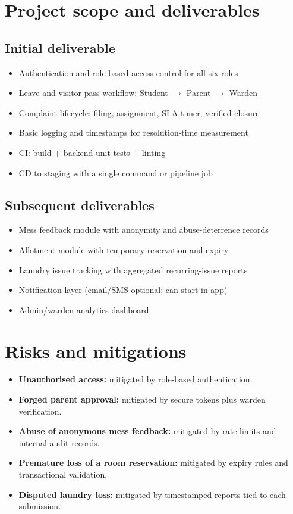 \documentclass[11pt,a4paper]{article}
\begin{document}
\section{Project scope and deliverables }
\subsection{Initial deliverable }
\begin{itemize}[leftmargin=0.7cm]
    \item Authentication and role-based access control for all six roles
    \item Leave and visitor pass workflow: Student $\rightarrow$ Parent $\rightarrow$ Warden
    \item Complaint lifecycle: filing, assignment, SLA timer, verified closure
    \item Basic logging and timestamps for resolution-time measurement
    \item CI: build + backend unit tests + linting
    \item CD to staging with a single command or pipeline job
\end{itemize}

\subsection{Subsequent deliverables}
\begin{itemize}[leftmargin=0.7cm]
    \item Mess feedback module with anonymity and abuse-deterrence records
    \item Allotment module with temporary reservation and expiry
    \item Laundry issue tracking with aggregated recurring-issue reports
    \item Notification layer (email/SMS optional; can start in-app)
    \item Admin/warden analytics dashboard
\end{itemize}

\section{Risks and mitigations}
\begin{itemize}[leftmargin=0.7cm]
    \item \textbf{Unauthorised access:} mitigated by role-based authentication.
    \item \textbf{Forged parent approval:} mitigated by secure tokens plus warden
    verification.
    \item \textbf{Abuse of anonymous mess feedback:} mitigated by rate limits and internal
    audit records.
    \item \textbf{Premature loss of a room reservation:} mitigated by expiry rules and
    transactional validation.
    \item \textbf{Disputed laundry loss:} mitigated by timestamped reports tied to each
    submission.
\end{itemize}
\end{document}
